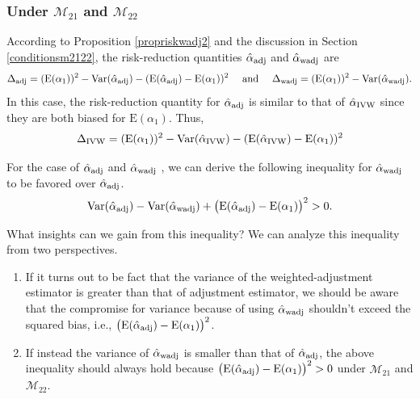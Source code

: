 \documentclass[11pt]{article}
\def\mrm#1{\mathrm{#1}} %
\def\mc#1{\mathcal{#1}} %
\def\E#1{\mathrm{E}(#1)} %
\def\var#1{\mathrm{Var}(#1)} %
\theoremstyle{definition}
\begin{document}
\subsubsection{Under $\mc{M}_{21}$ and $\mc{M}_{22}$}

According to Proposition \ref{propriskwadj2} and the discussion in Section \ref{conditionsm2122}, the risk-reduction quantities $\hat{\alpha}_{\rm adj}$ and $\hat{\alpha}_{\rm wadj}$ are
\begin{align*}
  \Delta_{\rm adj} 
  = (\E{\alpha_1})^2 -\var{\hat{\alpha}_{\rm adj}} -(\E{\hat{\alpha}_{\rm adj}}-\E{\alpha_1})^2
\quad   \text{ and } \quad 
  \Delta_{\rm wadj} 
  = (\E{\alpha_1})^2-\var{\hat{\alpha}_{\rm wadj}}.
\end{align*}
In this case, the risk-reduction quantity for $\hat{\alpha}_{\rm adj}$ is similar to that of $\hat{\alpha}_{\rm IVW}$ since they are both biased for $\E{\alpha_1}$.  Thus,
\begin{align*}
 \Delta_{\rm IVW} 
  = (\E{\alpha_1})^2 -\var{\hat{\alpha}_{\rm IVW}} -(\E{\hat{\alpha}_{\rm IVW}}-\E{\alpha_1})^2
\end{align*}

For the case of $\hat{\alpha}_{\rm adj}$ and $\hat{\alpha}_{\rm wadj}$ , we can derive the following inequality for $\hat{\alpha}_{\rm wadj}$ to be favored over $\hat{\alpha}_{\rm adj}$.
 \begin{align*}
  \var{\hat{\alpha}_{\rm adj}} 
  -\var{\hat{\alpha}_{\rm wadj}} + \big(\E{\hat{\alpha}_{\rm adj}}-\mrm{E}(\alpha_1)\big)^2> 0.
\end{align*}
 
 What insights can we gain from this inequality? We can analyze this inequality from two perspectives. 
 \begin{enumerate}
   \item If it turns out to be fact that the variance of the weighted-adjustment estimator is greater than that of adjustment estimator, we should be aware that  the compromise for variance because of using $\hat{\alpha}_{\rm wadj}$ shouldn't exceed the squared bias, i.e., $\big(\E{\hat{\alpha}_{\rm adj}}-\mrm{E}(\alpha_1)\big)^2$.
   \item If instead the variance of $\hat{\alpha}_{\rm wadj}$ is smaller than that of $\hat{\alpha}_{\rm adj}$, the above inequality should always hold because $\big(\E{\hat{\alpha}_{\rm adj}}-\mrm{E}(\alpha_1)\big)^2>0$ under $\mc{M}_{21}$ and $\mc{M}_{22}$. 
 \end{enumerate}
  
\end{document}
